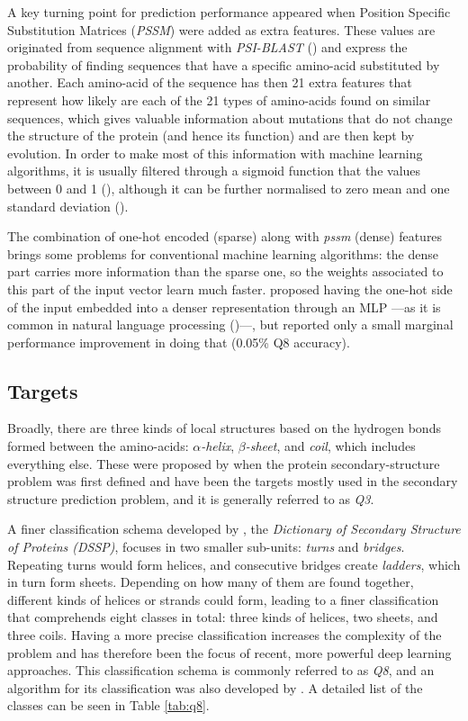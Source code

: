 A key turning point for prediction performance appeared when Position Specific Substitution Matrices (\textit{PSSM}) were added as extra features. These values are originated from sequence alignment with \textit{PSI-BLAST} (\cite{Altschul1997}) and express the probability of finding sequences that have a specific amino-acid substituted by another. Each amino-acid of the sequence has then 21 extra features that represent how likely are each of the 21 types of amino-acids found on similar sequences, which gives valuable information about mutations that do not change the structure of the protein (and hence its function) and are then kept by evolution. In order to make most of this information with machine learning algorithms, it is usually filtered through a sigmoid function that the values between 0 and 1 (\cite{Jones1999}), although it can be further normalised to zero mean and one standard deviation (\cite{Busia2017}).

The combination of one-hot encoded (sparse) along with \textit{pssm} (dense) features brings some problems for conventional machine learning algorithms: the dense part carries more information than the sparse one, so the weights associated to this part of the input vector learn much faster. \cite{Li2016} proposed having the one-hot side of the input embedded into a denser representation through an MLP ---as it is common in natural language processing (\cite{Mesnil2015})---, but reported only a small marginal performance improvement in doing that (0.05\% Q8 accuracy).

\subsection{Targets}
Broadly, there are three kinds of local structures based on the hydrogen bonds formed between the amino-acids: $\alpha$\textit{-helix}, $\beta$\textit{-sheet}, and \textit{coil}, which includes everything else. These were proposed by \cite{Pauling1951} when the protein secondary-structure problem was first defined and have been the targets mostly used in the secondary structure prediction problem, and it is generally referred to as \textit{Q3}.

A finer classification schema developed by \cite{Kabsch1983}, the \textit{Dictionary of Secondary Structure of Proteins (DSSP)}, focuses in two smaller sub-units: \textit{turns} and \textit{bridges}. Repeating turns would form helices, and consecutive bridges create \textit{ladders}, which in turn form sheets. Depending on how many of them are found together, different kinds of helices or strands could form, leading to a finer classification that comprehends eight classes in total: three kinds of helices, two sheets, and three coils. Having a more precise classification increases the complexity of the problem and has therefore been the focus of recent, more powerful deep learning approaches. This classification schema is commonly referred to as \textit{Q8}, and an algorithm for its classification was also developed by \cite{Kabsch1983}. A detailed list of the classes can be seen in Table \ref{tab:q8}.

